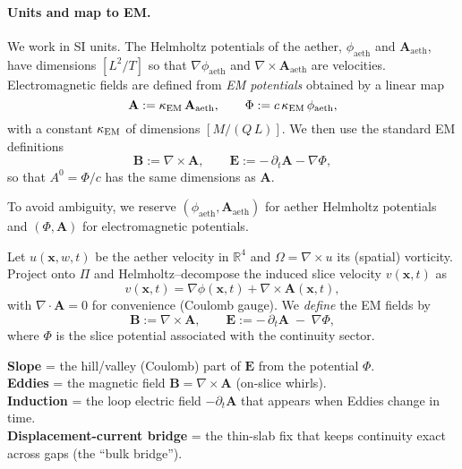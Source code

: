 \paragraph{Units and map to EM.}
We work in SI units. The Helmholtz potentials of the aether,
$\phi_{\text{aeth}}$ and $\mathbf A_{\text{aeth}}$, have dimensions $[L^2/T]$
so that $\nabla\phi_{\text{aeth}}$ and $\nabla\times\mathbf A_{\text{aeth}}$
are velocities. Electromagnetic fields are defined from \emph{EM potentials}
obtained by a linear map
\begin{equation}
  \mathbf A := \kappa_{\rm EM}\,\mathbf A_{\text{aeth}},\qquad
  \Phi := c\,\kappa_{\rm EM}\,\phi_{\text{aeth}},
  \label{eq:aether-to-em-potentials}
\end{equation}
with a constant $\kappa_{\rm EM}$ of dimensions $[M/(Q\,L)]$.
We then use the standard EM definitions
\begin{equation}
  \mathbf B := \nabla\times\mathbf A,\qquad
  \mathbf E := -\,\partial_t \mathbf A - \nabla \Phi,
  \label{eq:EM_defs_fixed}
\end{equation}
so that $A^0=\Phi/c$ has the same dimensions as $\mathbf A$.

To avoid ambiguity, we reserve $(\phi_{\text{aeth}}, \mathbf A_{\text{aeth}})$
for aether Helmholtz potentials and $(\Phi, \mathbf A)$ for electromagnetic
potentials.

Let $u(\mathbf x,w,t)$ be the aether velocity in $\mathbb{R}^4$ and $\Omega=\nabla\!\times u$ its (spatial) vorticity. Project onto $\Pi$ and Helmholtz–decompose the induced slice velocity $v(\mathbf x,t)$ as
\[
v(\mathbf x,t)=\nabla\phi(\mathbf x,t)+\nabla\times\mathbf A(\mathbf x,t),
\]
with $\nabla\!\cdot\!\mathbf A=0$ for convenience (Coulomb gauge). We \emph{define} the EM fields by
\begin{equation}
\mathbf B := \nabla\times\mathbf A,
\qquad
\mathbf E := -\,\partial_t \mathbf A \;-\; \nabla \Phi,
\label{eq:EM_defs}
\end{equation}
where $\Phi$ is the slice potential associated with the continuity sector.

\begin{tcolorbox}[title=Plain-language map]
\textbf{Slope} = the hill/valley (Coulomb) part of $\mathbf E$ from the potential $\Phi$.\\
\textbf{Eddies} = the magnetic field $\mathbf B=\nabla\times\mathbf A$ (on-slice whirls).\\
\textbf{Induction} = the loop electric field $-\partial_t\mathbf A$ that appears when Eddies change in time.\\
\textbf{Displacement-current bridge} = the thin-slab fix that keeps continuity exact across gaps (the ``bulk bridge'').
\end{tcolorbox}

